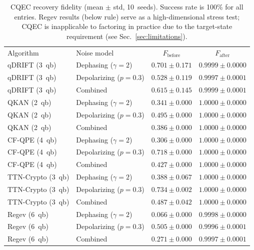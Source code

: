 \documentclass[prx,twocolumn,superscriptaddress,longbibliography,floatfix]{revtex4-2}
\begin{document}
\begin{table}[t]
\caption{CQEC recovery fidelity (mean $\pm$ std, 10~seeds). Success rate is 100\% for all entries. Regev results (below rule) serve as a high-dimensional stress test; CQEC is inapplicable to factoring in practice due to the target-state requirement (see Sec.~\ref{sec:limitations}).}
\label{tab:main}
\begin{ruledtabular}
\begin{tabular}{llcc}
Algorithm & Noise model & $F_\mathrm{before}$ & $F_\mathrm{after}$ \\
\colrule
qDRIFT (3~qb) & Dephasing ($\gamma=2$) & $0.701 \pm 0.171$ & $0.9999 \pm 0.0000$ \\
qDRIFT (3~qb) & Depolarizing ($p=0.3$) & $0.528 \pm 0.119$ & $0.9997 \pm 0.0001$ \\
qDRIFT (3~qb) & Combined & $0.615 \pm 0.145$ & $0.9999 \pm 0.0001$ \\
QKAN (2~qb) & Dephasing ($\gamma=2$) & $0.341 \pm 0.000$ & $1.0000 \pm 0.0000$ \\
QKAN (2~qb) & Depolarizing ($p=0.3$) & $0.495 \pm 0.000$ & $1.0000 \pm 0.0000$ \\
QKAN (2~qb) & Combined & $0.386 \pm 0.000$ & $1.0000 \pm 0.0000$ \\
CF-QPE (4~qb) & Dephasing ($\gamma=2$) & $0.306 \pm 0.000$ & $1.0000 \pm 0.0000$ \\
CF-QPE (4~qb) & Depolarizing ($p=0.3$) & $0.718 \pm 0.000$ & $1.0000 \pm 0.0000$ \\
CF-QPE (4~qb) & Combined & $0.427 \pm 0.000$ & $1.0000 \pm 0.0000$ \\
TTN-Crypto (3~qb) & Dephasing ($\gamma=2$) & $0.388 \pm 0.067$ & $1.0000 \pm 0.0000$ \\
TTN-Crypto (3~qb) & Depolarizing ($p=0.3$) & $0.734 \pm 0.002$ & $1.0000 \pm 0.0000$ \\
TTN-Crypto (3~qb) & Combined & $0.487 \pm 0.042$ & $1.0000 \pm 0.0000$ \\
\colrule
Regev (6~qb) & Dephasing ($\gamma=2$) & $0.066 \pm 0.000$ & $0.9998 \pm 0.0000$ \\
Regev (6~qb) & Depolarizing ($p=0.3$) & $0.505 \pm 0.000$ & $0.9996 \pm 0.0001$ \\
Regev (6~qb) & Combined & $0.271 \pm 0.000$ & $0.9997 \pm 0.0001$ \\
\end{tabular}
\end{ruledtabular}
\end{table}
\end{document}
